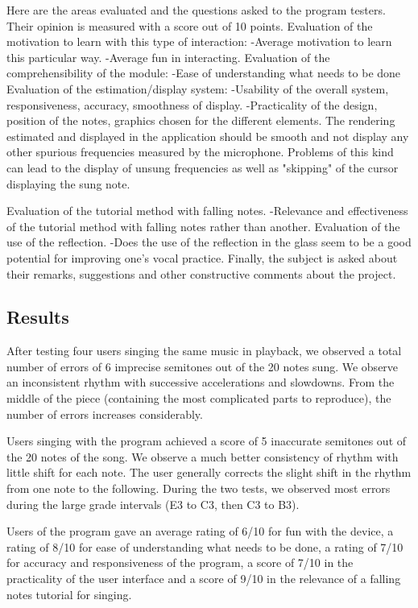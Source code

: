 Here are the areas evaluated and the questions asked to the program testers. Their opinion is measured with a score out of 10 points.
Evaluation of the motivation to learn with this type of interaction: -Average motivation to learn this particular way. -Average fun in interacting.
Evaluation of the comprehensibility of the module: -Ease of understanding what needs to be done Evaluation of the estimation/display system: -Usability of the overall system, responsiveness, accuracy, smoothness of display. -Practicality of the design, position of the notes, graphics chosen for the different elements. The rendering estimated and displayed in the application should be smooth and not display any other spurious frequencies measured by the microphone. Problems of this kind can lead to the display of unsung frequencies as well as "skipping" of the cursor displaying the sung note. 

Evaluation of the tutorial method with falling notes. -Relevance and effectiveness of the tutorial method with falling notes rather than another.
Evaluation of the use of the reflection. -Does the use of the reflection in the glass seem to be a good potential for improving one’s vocal practice. Finally, the subject is asked about their remarks, suggestions and other constructive comments about the project.

\subsection{Results}

After testing four users singing the same music in playback, we observed a total number of errors of 6 imprecise semitones out of the 20 notes sung. We observe an inconsistent rhythm with successive accelerations and slowdowns. From the middle of the piece (containing the most complicated parts to reproduce), the number of errors increases considerably.

Users singing with the program achieved a score of 5 inaccurate semitones out of the 20 notes of the song. We observe a much better consistency of rhythm with little shift for each note. The user generally corrects the slight shift in the rhythm from one note to the following. During the two tests, we observed most errors during the large grade intervals (E3 to C3, then C3 to B3).

Users of the program gave an average rating of 6/10 for fun with the device, a rating of 8/10 for ease of understanding what needs to be done, a rating of 7/10 for accuracy and responsiveness of the program, a score of 7/10 in the practicality of the user interface and a score of 9/10 in the relevance of a falling notes tutorial for singing.

